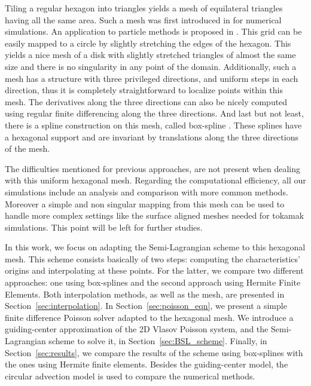 \documentclass[proc]{edpsmath}
\begin{document}
Tiling a regular hexagon into triangles yields a mesh of equilateral triangles having all the same area.
Such a mesh was first introduced in \cite{Sadourny1968} for numerical simulations. An application to particle methods is proposed in \cite{chatelain2008isotropic}.
This grid can be easily mapped to a circle by slightly stretching the edges of the hexagon. This yields a nice mesh of a disk with slightly stretched triangles of almost the same size and there is no singularity in any point of the domain. 
Additionally, such a mesh has a structure with three privileged directions, and uniform steps in each direction, thus it is completely straightforward to localize points within this mesh. The derivatives along the three directions can also be nicely computed using regular finite differencing along the three directions. 
And last but not least, there is a spline construction on this mesh, called box-spline \cite{Condat2008}. These splines have a hexagonal support and are invariant by translations along the three directions of the mesh. 

The difficulties mentioned for previous approaches, are not present when dealing with this uniform hexagonal mesh. Regarding the computational efficiency, all our simulations include an analysis and comparison with more common methods. 
Moreover a simple and non singular mapping from this mesh can be used  to handle more complex settings
like the surface aligned meshes needed for tokamak simulations. This point will be left for further studies.

In this work, we focus on adapting the Semi-Lagrangian scheme to this hexagonal mesh. This scheme consists basically of two steps: computing the characteristics' origins and interpolating at these points. For the latter, we compare two different approaches: one using box-splines and the second approach using Hermite Finite Elements. Both interpolation methods, as well as the mesh, are presented in Section~\ref{sec:interpolation}. In Section~\ref{sec:poisson_eqn}, we present a simple finite difference Poisson solver adapted to the hexagonal mesh. We introduce a guiding-center approximation of the 2D Vlasov Poisson system\cite{Golse1998865}, and the Semi-Lagrangian scheme to solve it, in Section~\ref{sec:BSL_scheme}. Finally, in Section~\ref{sec:results}, we compare the results of the scheme using box-splines with the ones using Hermite finite elements. Besides the guiding-center model, the circular advection model is used to compare the numerical methods.


\end{document}
